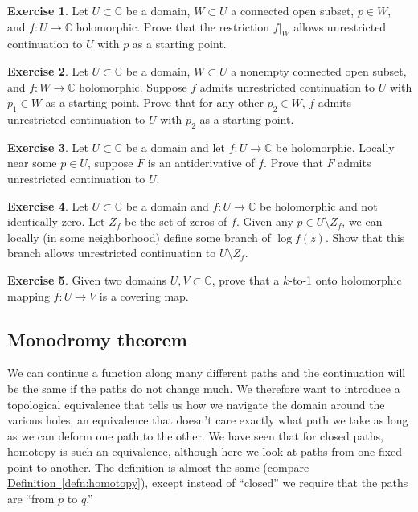 \documentclass[12pt,openany]{book}
\newcommand{\C}{{\mathbb{C}}}
\newcommand{\myquote}[1]{``#1''}
\theoremstyle{plain}
\theoremstyle{remark}
\theoremstyle{definition}
\newenvironment{exbox}{%
    \def\FrameCommand{\vrule width 1pt \relax\hspace{10pt}}%
    \MakeFramed{\advance\hsize-\width\FrameRestore}%
}{%
    \endMakeFramed
}
\theoremstyle{exercise}
\newtheorem{exercise}{Exercise}[section]
\theoremstyle{example}
\newcommand{\defnref}[1]{\hyperref[#1]{Definition~\ref*{#1}}}
\begin{document}
\begin{exbox}
\begin{exercise}
Let $U \subset \C$ be a domain, $W \subset U$ a connected open subset,
$p \in W$, and $f \colon U \to \C$ holomorphic.  Prove that the restriction
$f|_W$ allows unrestricted continuation to $U$ with $p$ as a starting point.
\end{exercise}

\begin{exercise}%
\label{exercise:startingpointcont}
Let $U \subset \C$ be a domain, $W \subset U$ a nonempty connected open subset,
and $f \colon W \to \C$ holomorphic.  Suppose $f$ admits unrestricted
continuation to $U$ with $p_1 \in W$ as a starting point.  Prove
that for any other $p_2 \in W$, $f$ admits unrestricted continuation
to $U$ with $p_2$ as a starting point.
\end{exercise}

\begin{exercise}
Let $U \subset \C$ be a domain and let
$f \colon U \to \C$ be holomorphic.  Locally near some $p \in U$,
suppose $F$ is an antiderivative of $f$.  Prove that $F$ admits unrestricted
continuation to $U$.
\end{exercise}

\begin{exercise}
Let $U \subset \C$ be a domain and $f \colon U \to \C$ be holomorphic and
not identically zero.  Let $Z_f$ be the set of zeros of $f$.  Given any $p
\in U \setminus Z_f$, we can locally (in some neighborhood) define some branch of $\log f(z)$.
Show that this branch allows unrestricted continuation to $U \setminus Z_f$.
\end{exercise}

\begin{exercise}
Given two domains $U,V \subset \C$,
prove that a $k$-to-1 onto holomorphic mapping $f \colon U \to V$ is a covering map.
\end{exercise}
\end{exbox}

\subsection{Monodromy theorem}

We can continue a function along many different paths and the continuation
will be the same if the paths do not change much.  We therefore want to
introduce a topological equivalence that tells us how we navigate the domain
around the various holes, an equivalence that doesn't care exactly what
path we take as long as we can deform one path to the other.
We have seen that for closed paths, homotopy is such an equivalence, although
here we look at paths from one fixed point to another.  The definition
is almost the same (compare \defnref{defn:homotopy}), except instead of
\myquote{closed} we require that the paths
are \myquote{from $p$ to $q$.}
\end{document}
